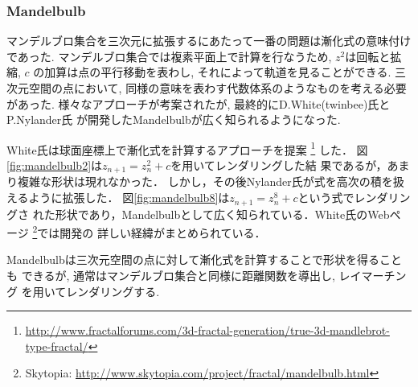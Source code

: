 \subsubsection{Mandelbulb}

マンデルブロ集合を三次元に拡張するにあたって一番の問題は漸化式の意味付けであった.
マンデルブロ集合では複素平面上で計算を行なうため, $z^2$は回転と拡縮, $c$
の加算は点の平行移動を表わし, それによって軌道を見ることができる.
三次元空間の点において, 同様の意味を表わす代数体系のようなものを考える必要があった.
様々なアプローチが考案されたが, 最終的にD.White(twinbee)氏とP.Nylander氏
が開発したMandelbulbが広く知られるようになった.

White氏は球面座標上で漸化式を計算するアプローチを提案
\footnote{\url{http://www.fractalforums.com/3d-fractal-generation/true-3d-mandlebrot-type-fractal/}}
した．
図\ref{fig:mandelbulb2}は$z_{n+1} = z_n^2 + c$を用いてレンダリングした結
果であるが，あまり複雑な形状は現れなかった．
しかし，その後Nylander氏が式を高次の積を扱えるように拡張した．
図\ref{fig:mandelbulb8}は$z_{n+1} = z_n^8 + c $という式でレンダリングさ
れた形状であり，Mandelbulbとして広く知られている．White氏のWebページ
\footnote{Skytopia:
\url{http://www.skytopia.com/project/fractal/mandelbulb.html}}では開発の
詳しい経緯がまとめられている．

Mandelbulbは三次元空間の点に対して漸化式を計算することで形状を得ることも
できるが, 通常はマンデルブロ集合と同様に距離関数を導出し, レイマーチング
を用いてレンダリングする.

